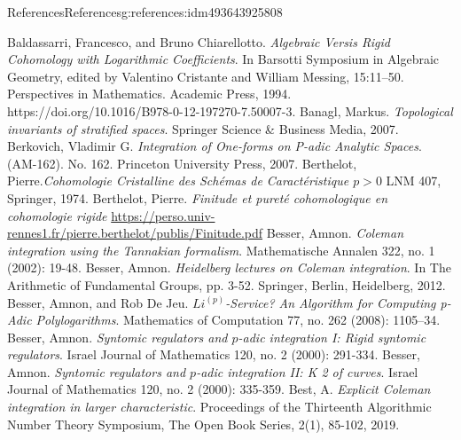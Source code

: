 \documentclass[oneside,10pt,]{book}
\numberwithin{equation}{section}
\newcommand{\gt}{>}
\begin{document}
\begin{references-chapter-numberless}{References}{}{References}{}{}{g:references:idm493643925808}
\begin{thebibliography}{9}
\hypertarget{x:biblio:bib-baldassarri-chiarallotto}{}Baldassarri, Francesco, and Bruno Chiarellotto. \textit{Algebraic Versis Rigid Cohomology with Logarithmic Coefficients}. In Barsotti Symposium in Algebraic Geometry, edited by Valentino Cristante and William Messing, 15:11–50. Perspectives in Mathematics. Academic Press, 1994. https:\slash{}\slash{}doi.org\slash{}10.1016\slash{}B978-0-12-197270-7.50007-3.
\hypertarget{x:biblio:bib-banagl}{}Banagl, Markus. \textit{Topological invariants of stratified spaces}. Springer Science \& Business Media, 2007.
\hypertarget{x:biblio:bib-berkovich}{}Berkovich, Vladimir G.  \textit{Integration of One-forms on P-adic Analytic Spaces}. (AM-162). No. 162. Princeton University Press, 2007.
\hypertarget{x:biblio:bib-berth1}{}Berthelot, Pierre.\textit{Cohomologie Cristalline des Schémas de Caractéristique \(p\gt 0\)} LNM 407, Springer, 1974.
\hypertarget{x:biblio:bib-berth2}{}Berthelot, Pierre.  \textit{Finitude et pureté cohomologique en cohomologie rigide} \url{https://perso.univ-rennes1.fr/pierre.berthelot/publis/Finitude.pdf}
\hypertarget{x:biblio:bib-besser-coleman-tannakian}{}Besser, Amnon. \textit{Coleman integration using the Tannakian formalism}. Mathematische Annalen 322, no. 1 (2002): 19-48.
\hypertarget{x:biblio:bib-besser-coleman-heidelberg}{}Besser, Amnon. \textit{Heidelberg lectures on Coleman integration}. In The Arithmetic of Fundamental Groups, pp. 3-52. Springer, Berlin, Heidelberg, 2012.
\hypertarget{x:biblio:bib-besser-de-jeu}{}Besser, Amnon, and Rob De Jeu. \textit{\(Li^{(p)}\)-Service? An Algorithm for Computing p-Adic Polylogarithms}. Mathematics of Computation 77, no. 262 (2008): 1105–34.
\hypertarget{x:biblio:bib-besser-syntomic-I}{}Besser, Amnon. \textit{Syntomic regulators and \(p\)-adic integration I: Rigid syntomic regulators}. Israel Journal of Mathematics 120, no. 2 (2000): 291-334.
\hypertarget{x:biblio:bib-besser-syntomic-II}{}Besser, Amnon. \textit{Syntomic regulators and \(p\)-adic integration II: K 2 of curves}. Israel Journal of Mathematics 120, no. 2 (2000): 335-359.
\hypertarget{x:biblio:bib-best-coleman-harvey}{}Best, A. \textit{Explicit Coleman integration in larger characteristic}. Proceedings of the Thirteenth Algorithmic Number Theory Symposium, The Open Book Series, 2(1), 85-102, 2019.

\end{thebibliography}
\end{references-chapter-numberless}
\end{document}
